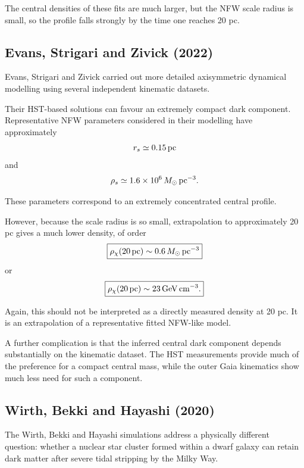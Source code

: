 \documentclass[11pt,a4paper]{article}
\begin{document}
The central densities of these fits are much larger, but the NFW scale radius is small, so the profile falls strongly by the time one reaches 20 pc.


\subsection{Evans, Strigari and Zivick (2022)}

Evans, Strigari and Zivick carried out more detailed axisymmetric dynamical modelling using several independent kinematic datasets.

Their HST-based solutions can favour an extremely compact dark component. Representative NFW parameters considered in their modelling have approximately
\begin{equation}
r_s\simeq0.15\,{\rm pc}
\end{equation}
and
\begin{equation}
\rho_s\simeq1.6\times10^6
\,M_\odot\,{\rm pc}^{-3}.
\end{equation}

These parameters correspond to an extremely concentrated central profile.

However, because the scale radius is so small, extrapolation to approximately 20 pc gives a much lower density, of order
\begin{equation}
\boxed{
\rho_\chi(20\,{\rm pc})
\sim0.6\,M_\odot\,{\rm pc}^{-3}
}
\end{equation}
or
\begin{equation}
\boxed{
\rho_\chi(20\,{\rm pc})
\sim23\,{\rm GeV\,cm^{-3}}.
}
\end{equation}

Again, this should not be interpreted as a directly measured density at 20 pc. It is an extrapolation of a representative fitted NFW-like model.

A further complication is that the inferred central dark component depends substantially on the kinematic dataset. The HST measurements provide much of the preference for a compact central mass, while the outer Gaia kinematics show much less need for such a component.


\subsection{Wirth, Bekki and Hayashi (2020)}

The Wirth, Bekki and Hayashi simulations address a physically different question: whether a nuclear star cluster formed within a dwarf galaxy can retain dark matter after severe tidal stripping by the Milky Way.
\end{document}

